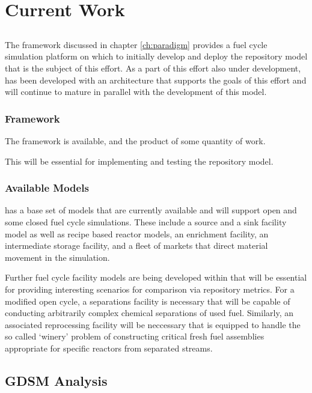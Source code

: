 \chapter{Current Work}\label{ch:current}

\section{\Cyclus}

The \Cyclus framework discussed in chapter \ref{ch:paradigm} provides a fuel 
cycle simulation platform on which to initially develop and deploy the 
repository model that is the subject of this effort. As a part of this effort 
also under development, \Cyclus has been developed with an architecture that 
supports the goals of this effort and will continue to mature in parallel with 
the development of this model.

\subsection{Framework}

The \Cyclus framework is available, and the product of some quantity of work. 

This will be essential for implementing and testing the repository model.

\subsection{Available Models}

\Cyclus has a base set of models that are currently available and will support 
open and some closed fuel cycle simulations. These include a source and a sink 
facility model as well as recipe based reactor models, an enrichment facility, 
an intermediate storage facility, and a fleet of markets that direct material 
movement in the simulation.

Further fuel cycle facility models are being developed within \Cyclus  that 
will be essential for providing interesting scenarios for comparison via 
repository metrics. For a modified open cycle, a separations facility is 
necessary that will be capable of conducting arbitrarily complex chemical 
separations of used fuel. Similarly, an associated reprocessing facility  will 
be neccessary that is equipped to handle the so called `winery' problem of 
constructing critical fresh fuel assemblies appropriate for specific reactors 
from separated streams.


\section{GDSM Analysis}


